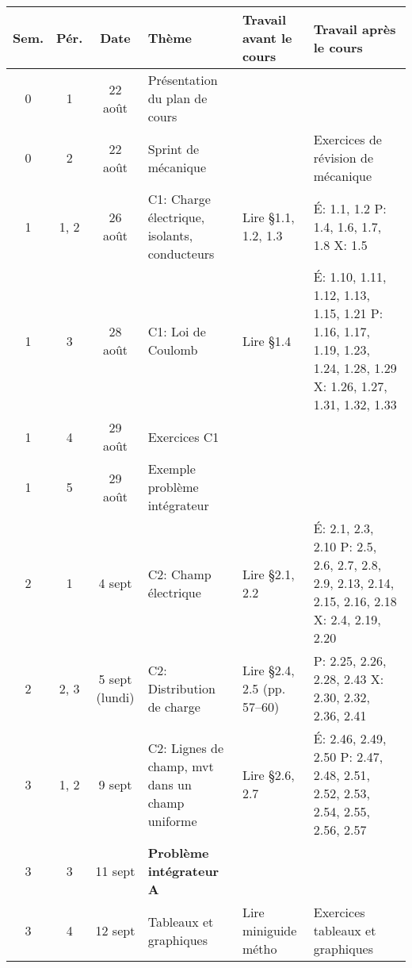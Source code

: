 \documentclass[10pt]{article}
\begin{document}
\sffamily
\renewcommand{\arraystretch}{1.2}
\begin{longtable}{cccp{6cm}lp{9cm}}
  \toprule
  \textbf{Sem.}  &  \textbf{Pér.}  &  \textbf{Date}  &  \textbf{Thème}
    &  \textbf{Travail avant le cours}
    &  \textbf{Travail après le cours}  \\
  \midrule
  \endhead
  0     &  1     &  22 août  &  Présentation du plan de cours
    &  &  \\
  0     &  2     &  22 août  &  Sprint de mécanique
    &  &  Exercices de révision de mécanique  \\
  \midrule
  1     &  1, 2  &  26 août     &  C1: Charge électrique, isolants, conducteurs
    & Lire \S 1.1, 1.2, 1.3
    & É: 1.1, 1.2 \newline 
      P: 1.4, 1.6, 1.7, 1.8 \newline 
      X: 1.5  \\
  1     &  3     &  28 août     &  C1: Loi de Coulomb
    & Lire \S 1.4
    & É: 1.10, 1.11, 1.12, 1.13, 1.15, 1.21 \newline
      P: 1.16, 1.17, 1.19, 1.23, 1.24, 1.28, 1.29 \newline 
      X: 1.26, 1.27, 1.31, 1.32, 1.33 \\
  1     &  4     &  29 août  &  Exercices C1
    &   &    \\
  1     &  5     &  29 août   &  Exemple problème intégrateur
    &   &    \\
  \midrule
  2     &  1     &  4 sept          &  C2: Champ électrique
    &  Lire \S 2.1, 2.2
    &  É: 2.1, 2.3, 2.10 \newline 
       P: 2.5, 2.6, 2.7, 2.8, 2.9, 2.13, 2.14, 2.15, 2.16, 2.18  \newline
       X: 2.4, 2.19, 2.20 \\
  2     &  2, 3     &  5 sept (lundi)  &  C2: Distribution de charge
    &  Lire \S 2.4, 2.5 (pp. 57--60)
    &  P: 2.25, 2.26, 2.28, 2.43 \newline
       X: 2.30, 2.32, 2.36, 2.41 \\
  \midrule
  3     &  1, 2  &  9 sept    &  C2: Lignes de champ, mvt dans un champ uniforme
    & Lire \S 2.6, 2.7
    &  É: 2.46, 2.49, 2.50 \newline 
       P: 2.47, 2.48, 2.51, 2.52, 2.53, 2.54, 2.55, 2.56, 2.57 \\
  3     &  3     &  11 sept  &  \textbf{Problème intégrateur A}  \\
  3     &  4     &  12 sept   &  Tableaux et graphiques
    & Lire miniguide métho
    & Exercices tableaux et graphiques  \\

\end{longtable}
\end{document}
